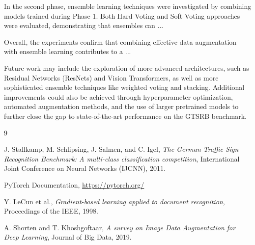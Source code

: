 \documentclass[conference,a4paper]{IEEEtran}
\begin{document}
In the second phase, ensemble learning techniques were investigated by combining models trained during Phase 1. Both Hard Voting and Soft Voting approaches were evaluated, demonstrating that ensembles can ...

Overall, the experiments confirm that combining effective data augmentation with ensemble learning contributes to a ...

Future work may include the exploration of more advanced architectures, such as Residual Networks (ResNets) and Vision Transformers, as well as more sophisticated ensemble techniques like weighted voting and stacking. Additional improvements could also be achieved through hyperparameter optimization, automated augmentation methods, and the use of larger pretrained models to further close the gap to state-of-the-art performance on the GTSRB benchmark.


\begin{thebibliography}{9}

J. Stallkamp, M. Schlipsing, J. Salmen, and C. Igel,
\textit{The German Traffic Sign Recognition Benchmark: A multi-class classification competition},
International Joint Conference on Neural Networks (IJCNN), 2011.

PyTorch Documentation,
\url{https://pytorch.org/}

Y. LeCun et al.,
\textit{Gradient-based learning applied to document recognition},
Proceedings of the IEEE, 1998.

A. Shorten and T. Khoshgoftaar,
\textit{A survey on Image Data Augmentation for Deep Learning},
Journal of Big Data, 2019.

\end{thebibliography}
\end{document}
